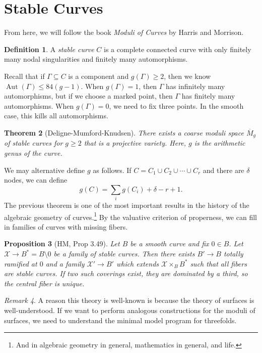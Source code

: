 \documentclass[leqno, openany]{memoir}
\newtheorem{thm}{Theorem}[section]
\newtheorem{prop}[thm]{Proposition}
\theoremstyle{definition}
\newtheorem{defn}[thm]{Definition}
\theoremstyle{remark}
\newtheorem{rmk}[thm]{Remark}
\theoremstyle{plain}
\theoremstyle{definition}
\theoremstyle{remark}
\newcommand{\mc}[1]{\mathcal{#1}}
\newcommand{\ol}[1]{\overline{#1}}
\DeclareMathOperator{\Aut}{Aut}
\begin{document}
\section{Stable Curves}%

From here, we will follow the book \textit{Moduli of Curves} by Harris and
Morrison.

\begin{defn} A \textit{stable curve} $C$ is a complete connected curve with
only finitely many nodal singularities and finitely many automorphisms.
\end{defn}

Recall that if $\Gamma \subseteq C$ is a component and $g(\Gamma) \geq 2$, then
we know $\Aut(\Gamma) \leq 84(g-1)$. When $g(\Gamma) = 1$, then $\Gamma$ has
infinitely many automorphisms, but if we choose a marked point, then $\Gamma$
has finitely many automorphisms. When $g(\Gamma) = 0$, we need to fix three
points. In the smooth case, this kills all automorphisms.

\begin{thm}[Deligne-Mumford-Knudsen] There exists a coarse moduli space
$\ol{M}_g$ of stable curves for $g \geq 2$ that is a projective variety. Here,
$g$ is the arithmetic genus of the curve.  \end{thm}

We may alternative define $g$ as follows. If $C = C_1 \cup C_2 \cup \cdots \cup
C_r$ and there are $\delta$ nodes, we can define \[ g(C) = \sum_i g(C_i) +
\delta - r + 1. \] The previous theorem is one of the most important results in
the history of the algebraic geometry of curves.\footnote{And in algebraic
geometry in general, mathematics in general, and life.} By the valuative
criterion of properness, we can fill in families of curves with missing fibers.

\begin{prop}[HM, Prop 3.49] Let $B$ be a smooth curve and fix $0 \in B$. Let
    $\mc{X} \to B^* = B \setminus 0$ be a family of stable curves. Then there
    exists $B' \to B$ totally ramified at $0$ and a family $\mc{X}' \to B'$
    which extends $\mc{X} \times_{B} B^*$ such that all fibers are stable
    curves. If two such coverings exist, they are dominated by a third, so the
    central fiber is unique.  \end{prop}

\begin{rmk} A reason this theory is well-known is because the theory of
    surfaces is well-understood. If we want to perform analogous constructions
    for the moduli of surfaces, we need to understand the minimal model program
    for threefolds.  \end{rmk}
\end{document}
